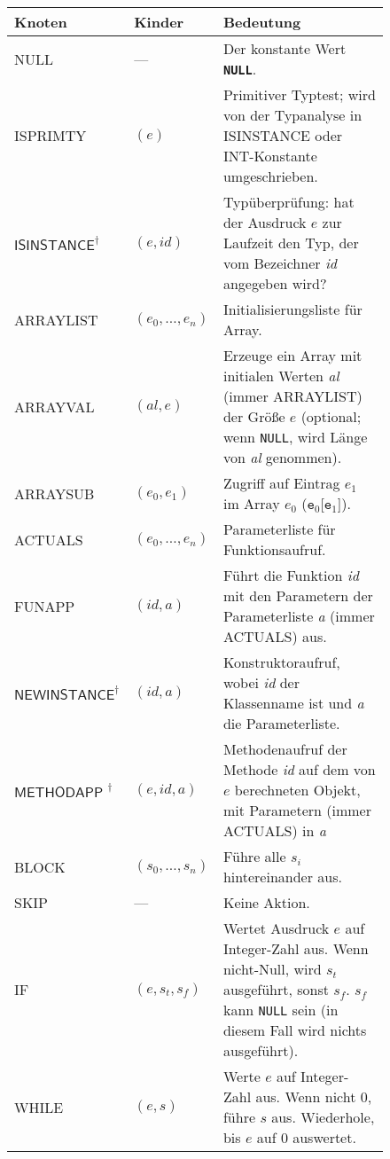 \documentclass[11pt,a4paper]{article}
\newcommand{\Cpp}[1]{\textcolor{dcyan}{\texttt{#1}}}
\newcommand{\Ckw}[1]{\textbf{\texttt{#1}}}
\begin{document}
\begin{figure}[h]
\begin{tabular}{|p{2.5cm}|p{2cm}|p{12cm}|}
\hline
\textbf{Knoten} & \textbf{Kinder} & \textbf{Bedeutung} \\
\hline
\hline
\textsf{NULL}		& ---		& Der konstante Wert \Ckw{NULL}.\\
\hline
\textsf{ISPRIMTY}	& $(e)$		& Primitiver Typtest; wird von der Typanalyse in \textsf{ISINSTANCE} oder \textsf{INT}-Konstante umgeschrieben. \\
\hline
$\textsf{ISINSTANCE}^{\dagger}$	& $(e, \textit{id})$ & Typüberprüfung: hat der Ausdruck $e$ zur Laufzeit den Typ, der vom Bezeichner \textit{id} angegeben wird? \\
\hline
\textsf{ARRAYLIST}	& $(e_0, \ldots, e_n)$ & Initialisierungsliste für Array. \\
\hline
\textsf{ARRAYVAL}	& $(\textit{al}, e)$ & Erzeuge ein Array mit initialen Werten \textit{al} (immer \textsf{ARRAYLIST}) der Größe $e$ (optional; wenn \Cpp{NULL}, wird Länge von \textit{al} genommen). \\
\hline
\textsf{ARRAYSUB}	& $(e_0, e_1)$	& Zugriff auf Eintrag $e_1$ im Array $e_0$ ($\texttt{e}_0$[$\texttt{e}_1$]). \\
\hline
\textsf{ACTUALS}	& $(e_0, \ldots, e_n)$ & Parameterliste für Funktionsaufruf. \\
\hline
\textsf{FUNAPP}		& $(\textit{id}, \textit{a})$ & Führt die Funktion \textit{id} mit den Parametern der Parameterliste \textit{a} (immer \textsf{ACTUALS}) aus. \\
\hline
$\textsf{NEWINSTANCE}^\dagger$	&$(\textit{id}, \textit{a})$ & Konstruktoraufruf, wobei \textit{id} der Klassenname ist und \textit{a} die Parameterliste.\\
\hline
$\textsf{METHODAPP  }^\dagger$	&$(e, \textit{id}, \textit{a})$ & Methodenaufruf der Methode \textit{id} auf dem von $e$ berechneten Objekt, mit Parametern (immer \textsf{ACTUALS}) in \textit{a} \\
\hline
\textsf{BLOCK}		& $(s_0, \ldots, s_n)$ & Führe alle $s_i$ hintereinander aus. \\
\hline
\textsf{SKIP} 		& ---		& Keine Aktion. \\
\hline
\textsf{IF}		& $(e, s_t, s_f)$ & Wertet Ausdruck $e$ auf Integer-Zahl aus.  Wenn nicht-Null, wird $s_t$ ausgeführt, sonst $s_f$.  $s_f$ kann \Cpp{NULL} sein (in diesem Fall wird nichts ausgeführt). \\
\hline
\textsf{WHILE}		& $(e, s)$	& Werte $e$ auf Integer-Zahl aus.  Wenn nicht $0$, führe $s$ aus.  Wiederhole, bis $e$ auf $0$ auswertet. \\

\end{tabular}
\end{figure}
\end{document}
